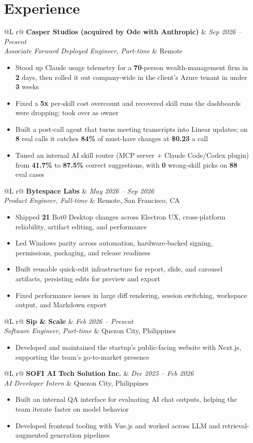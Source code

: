 \documentclass[a4paper,9pt]{article}
\makeatletter
\newenvironment{role}[4]
    {
    \begin{tabularx}{\linewidth}{@{}L r@{}}
    \textbf{#1} & \textit{#4} \\[-1pt]
    \textit{#3} & #2 \\[-2pt]
    \end{tabularx}
    \begin{minipage}[t]{\linewidth}
    \begin{itemize}
    }
    {
    \end{itemize}
    \end{minipage}
    \par\vspace{3pt}
    }
\makeatother
\begin{document}
\section{Experience}
\begin{role}{Casper Studios \textnormal{(acquired by Ode with Anthropic)}}{Remote}{Associate Forward Deployed Engineer, Part-time}{Sep 2026 -- Present}
\item Stood up Claude usage telemetry for a \textbf{70}-person wealth-management firm in \textbf{2} days, then rolled it out company-wide in the client's Azure tenant in under \textbf{3} weeks
\item Fixed a \textbf{5x} per-skill cost overcount and recovered skill runs the dashboards were dropping; took over as owner
\item Built a post-call agent that turns meeting transcripts into Linear updates; on \textbf{8} real calls it catches \textbf{84\%} of must-have changes at \textbf{\$0.23} a call
\item Tuned an internal AI skill router (MCP server + Claude Code/Codex plugin) from \textbf{41.7\%} to \textbf{87.5\%} correct suggestions, with \textbf{0} wrong-skill picks on \textbf{88} eval cases
\end{role}
\begin{role}{Bytespace Labs}{Remote, San Francisco, CA}{Product Engineer, Full-time}{May 2026 -- Sep 2026}
\item Shipped \textbf{21} Bot0 Desktop changes across Electron UX, cross-platform reliability, artifact editing, and performance
\item Led Windows parity across automation, hardware-backed signing, permissions, packaging, and release readiness
\item Built reusable quick-edit infrastructure for report, slide, and carousel artifacts, persisting edits for preview and export
\item Fixed performance issues in large diff rendering, session switching, workspace output, and Markdown export
\end{role}
\begin{role}{Sip \& Scale}{Quezon City, Philippines}{Software Engineer, Part-time}{Feb 2026 -- Present}
\item Developed and maintained the startup's public-facing website with Next.js, supporting the team's go-to-market presence
\end{role}
\begin{role}{SOFI AI Tech Solution Inc.}{Quezon City, Philippines}{AI Developer Intern}{Dec 2025 -- Feb 2026}
\item Built an internal QA interface for evaluating AI chat outputs, helping the team iterate faster on model behavior
\item Developed frontend tooling with Vue.js and worked across LLM and retrieval-augmented generation pipelines
\end{role}
\end{document}
